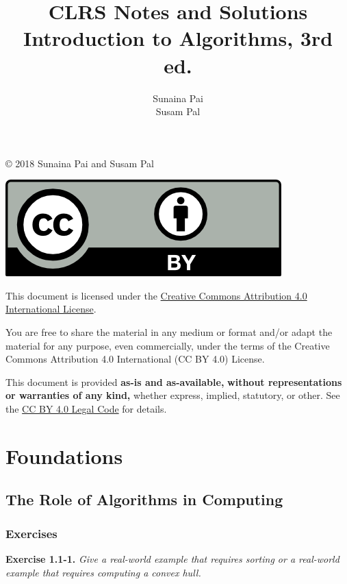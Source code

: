 \documentclass[oneside]{book}
\author{
    Sunaina Pai \\
    Susam Pal
}
\title{
    CLRS Notes and Solutions \\
    \large Introduction to Algorithms, 3rd ed.
}
\date{}
\newenvironment{itenv}[2]
               {\begin{trivlist}\item \textbf{#1 #2.} \itshape}
               {\end{trivlist}}
\newenvironment{exercise}[1]{\begin{itenv}{Exercise}{#1}}{\end{itenv}}
\begin{document}
\frontmatter
\maketitle
\newcommand{\ccby}[1]
           {\href{http://creativecommons.org/licenses/by/4.0/}{#1}}
\newcommand{\ccbylc}[1]
           {\href{https://creativecommons.org/licenses/by/4.0/legalcode}{#1}}

\copyright{} 2018 Sunaina Pai and Susam Pal

\ccby{\includegraphics[scale=0.75]{ccby.png}}

This document is licensed under the
\ccby{Creative Commons Attribution 4.0 International License}.

You are free to share the material in any medium or format and/or adapt
the material for any purpose, even commercially, under the terms of the
Creative Commons Attribution 4.0 International (CC BY 4.0) License.

This document is provided \textbf{as-is and as-available,}
\textbf{without representations or warranties of any kind,} whether
express, implied, statutory, or other. See the \ccbylc{CC BY 4.0 Legal
Code} for details.
\tableofcontents
\mainmatter


\part{Foundations}

\chapter{The Role of Algorithms in Computing}

\section*{Exercises}

\begin{exercise}{1.1-1}
Give a real-world example that requires sorting or a real-world example
that requires computing a convex hull.
\end{exercise}
\end{document}
